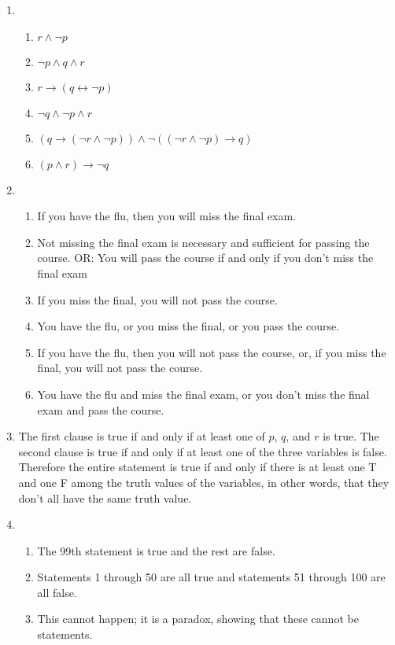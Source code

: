 \documentclass{sig-alternate-05-2015}
\begin{document}
\begin{enumerate}
\item
\begin{enumerate}
\item $r \wedge \neg  p$
\item $\neg p \wedge q\wedge r$
\item $r \rightarrow (q \leftrightarrow \neg p) $
\item $\neg q \wedge \neg p \wedge r$
\item $(q \rightarrow (\neg r\wedge \neg p))\wedge \neg((\neg r \wedge \neg p) \rightarrow q)$
\item $(p \wedge r) \rightarrow \neg q$
\end{enumerate}
\item
\begin{enumerate}
	\item If you have the flu, then you will miss the final exam.

	\item Not missing the final exam is necessary and sufficient for passing the course. OR: You
	will pass the course if and only if you don't miss the final exam
	\item If you miss the final, you will not pass the course.
	\item You have the flu, or you miss the final, or you pass the course.
	\item If you have the flu, then you will not pass the course, or, if you miss the final, you will
	not pass the course.
	\item You have the flu and miss the final exam, or you don't miss the final exam and pass
	the course.
\end{enumerate}

\item The first clause is true if and only if at least one of $p$, $q$, and
$r$ is true. The second clause is true if and only if at least one of
the three variables is false. Therefore the entire statement is
true if and only if there is at least one T and one F among the
truth values of the variables, in other words, that they don\textquoteright t all
have the same truth value.

\item 
\begin{enumerate}
	\item The
	99th statement is true and the rest are false.
	\item Statements
	1 through 50 are all true and statements 51 through 100 are
	all false.
	\item This cannot happen; it is a paradox, showing that
	these cannot be statements.
\end{enumerate}

\end{enumerate}
\end{document}

